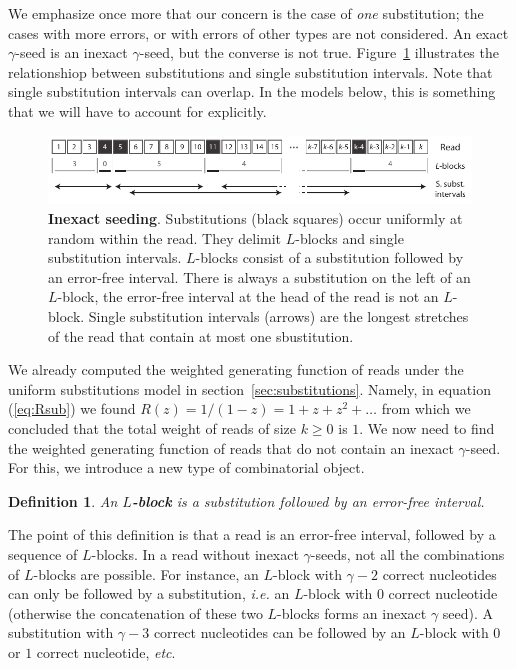 \documentclass{article}
\newtheorem{definition}{Definition}
\begin{document}
We emphasize once more that our concern is the case of \emph{one}
substitution; the cases with more errors, or with errors of other types
are not considered. An exact $\gamma$-seed is an inexact $\gamma$-seed,
but the converse is not true. Figure~\ref{fig:sketchinexact} illustrates
the relationshiop between substitutions and single substitution intervals.
Note that single substitution intervals can overlap. In the models below,
this is something that we will have to account for explicitly.

\begin{figure}[h]
\centering
\includegraphics[scale=0.88]{sketch_inexact_seeding.pdf}
\caption{\textbf{Inexact seeding}. Substitutions (black squares) occur
uniformly at random within the read. They delimit $L$-blocks and single
substitution intervals. $L$-blocks consist of a substitution followed by
an error-free interval. There is always a substitution on the left of an
$L$-block, the error-free interval at the head of the read is
not an $L$-block. Single substitution intervals (arrows) are the longest
stretches of the read that contain at most one sbustitution.}
\label{fig:sketchinexact}
\end{figure}


We already computed the weighted generating function of reads under the
uniform substitutions model in section~\ref{sec:substitutions}. Namely, in
equation (\ref{eq:Rsub}) we found $R(z) = 1/(1-z) = 1 + z + z^2 + \ldots$
from which we concluded that the total weight of reads of size $k \geq 0$
is $1$. We now need to find the weighted generating function of reads that
do not contain an inexact $\gamma$-seed. For this, we introduce a new type
of combinatorial object.

\begin{definition}
An \textbf{$L$-block} is a substitution followed by an error-free
interval.
\end{definition}

The point of this definition is that a read is an error-free interval,
followed by a sequence of $L$-blocks. In a read without inexact
$\gamma$-seeds, not all the combinations of $L$-blocks are possible. For
instance, an $L$-block with $\gamma-2$ correct nucleotides can only be
followed by a substitution, \textit{i.e.} an $L$-block with $0$ correct
nucleotide (otherwise the concatenation of these two $L$-blocks forms an
inexact $\gamma$ seed). A substitution with $\gamma-3$ correct nucleotides
can be followed by an $L$-block with $0$ or $1$ correct nucleotide,
\textit{etc}.
\end{document}
